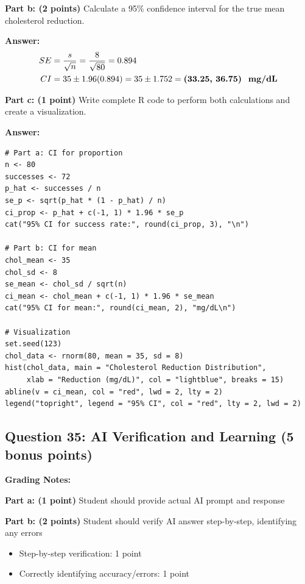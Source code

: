 \documentclass[11pt]{article}
\begin{document}
\textbf{Part b: (2 points)} Calculate a 95\% confidence interval for the true mean cholesterol reduction.

\textcolor{correctgreen}{\textbf{Answer:}}
\begin{align*}
SE &= \frac{s}{\sqrt{n}} = \frac{8}{\sqrt{80}} = 0.894\\
CI &= 35 \pm 1.96(0.894) = 35 \pm 1.752 = \textbf{(33.25, 36.75) \text{ mg/dL}}
\end{align*}

\textbf{Part c: (1 point)} Write complete R code to perform both calculations and create a visualization.

\textcolor{correctgreen}{\textbf{Answer:}}
\begin{verbatim}
# Part a: CI for proportion
n <- 80
successes <- 72
p_hat <- successes / n
se_p <- sqrt(p_hat * (1 - p_hat) / n)
ci_prop <- p_hat + c(-1, 1) * 1.96 * se_p
cat("95% CI for success rate:", round(ci_prop, 3), "\n")

# Part b: CI for mean
chol_mean <- 35
chol_sd <- 8
se_mean <- chol_sd / sqrt(n)
ci_mean <- chol_mean + c(-1, 1) * 1.96 * se_mean
cat("95% CI for mean:", round(ci_mean, 2), "mg/dL\n")

# Visualization
set.seed(123)
chol_data <- rnorm(80, mean = 35, sd = 8)
hist(chol_data, main = "Cholesterol Reduction Distribution",
     xlab = "Reduction (mg/dL)", col = "lightblue", breaks = 15)
abline(v = ci_mean, col = "red", lwd = 2, lty = 2)
legend("topright", legend = "95% CI", col = "red", lty = 2, lwd = 2)
\end{verbatim}

\vspace{1cm}

\subsection*{Question 35: AI Verification and Learning (5 bonus points)}

\textcolor{correctgreen}{\textbf{Grading Notes:}}

\textbf{Part a: (1 point)} Student should provide actual AI prompt and response

\textbf{Part b: (2 points)} Student should verify AI answer step-by-step, identifying any errors
\begin{itemize}
\item Step-by-step verification: 1 point
\item Correctly identifying accuracy/errors: 1 point
\end{itemize}
\end{document}
